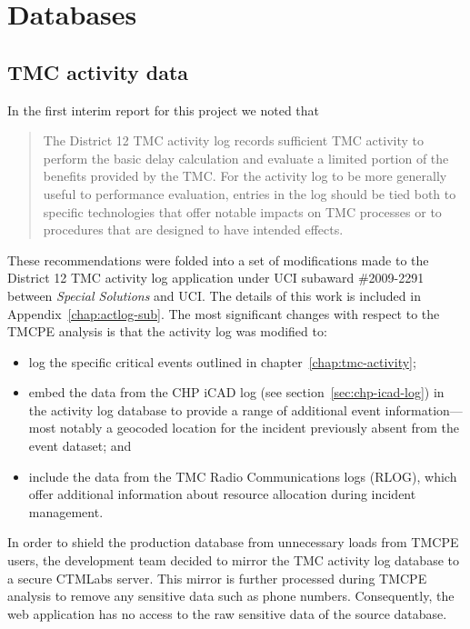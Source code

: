 \documentclass[12pt]{report}
\begin{document}
\section{Databases}
\label{sec:databases}

\subsection{TMC activity data}
\label{sec:activity-data}

In the first interim report for this project
\citep{rindt08:_measur_based_system_for_tmc_perfor_evaluat} we noted
that
\begin{quote}
  The District 12 \ac{TMC} activity log records sufficient \ac{TMC} activity to
  perform the basic delay calculation and evaluate a limited portion of the
  benefits provided by the \ac{TMC}. For the activity log to be more generally
  useful to performance evaluation, entries in the log should be tied both to
  specific technologies that offer notable impacts on \ac{TMC} processes or to
  procedures that are designed to have intended effects.
\end{quote}
These recommendations were folded into a set of modifications made to the
District 12 \ac{TMC} activity log application under UCI subaward \#2009-2291
between \emph{Special Solutions} and UCI.  The details of this work is included in
Appendix~\ref{chap:actlog-sub}.  The most significant changes with respect to
the \ac{TMCPE} analysis is that the activity log was modified to:
\begin{itemize}
\item log the specific critical events outlined in
  chapter~\ref{chap:tmc-activity};
\item embed the data from the \ac{CHP} \ac{iCAD} log (see
  section~\ref{sec:chp-icad-log}) in the activity log database to
  provide a range of additional event information---most notably a
  geocoded location for the incident previously absent from the event
  dataset; and
\item include the data from the \ac{TMC} Radio Communications logs (RLOG),
  which offer additional information about resource allocation during
  incident management.
\end{itemize}

In order to shield the production database from unnecessary loads from
\ac{TMCPE} users, the development team decided to mirror the \ac{TMC} activity
log database to a secure \ac{CTMLabs} server.  This mirror is further processed
during \ac{TMCPE} analysis to remove any sensitive data such as phone numbers.
Consequently, the web application has no access to the raw sensitive data of the
source database.
\end{document}
